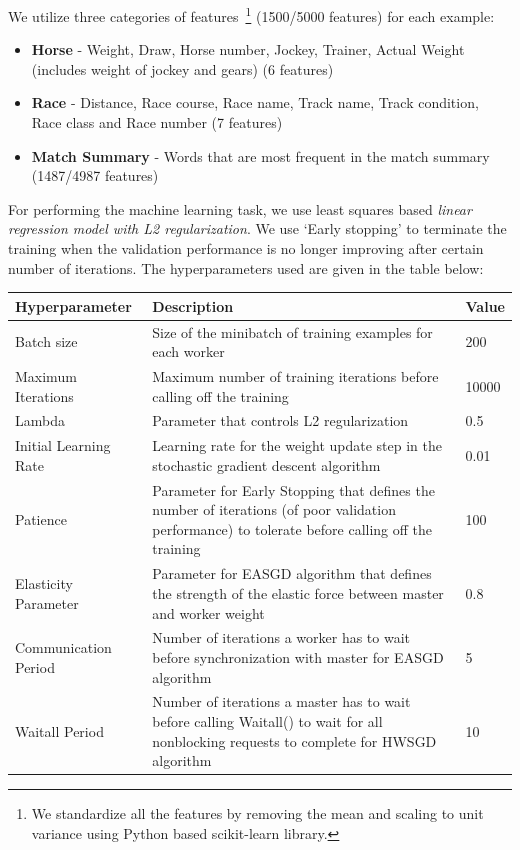\documentclass[12pt]{article}
\begin{document}
We utilize three categories of features~\footnote{We standardize all the features by removing the mean and scaling to unit variance using Python based scikit-learn library.} (1500/5000 features) for each example:
\begin{itemize}
  \item \textbf{Horse} - Weight, Draw, Horse number, Jockey, Trainer, Actual Weight (includes weight of jockey and gears) (6 features)
  \item \textbf{Race} - Distance, Race course, Race name, Track name, Track condition, Race class and Race number (7 features)
  \item \textbf{Match Summary} - Words that are most frequent in the match summary (1487/4987 features)
\end{itemize}

For performing the machine learning task, we use least squares based \textit{linear regression model with L2 regularization}. We use `Early stopping' to terminate the training when the validation performance is no longer improving after certain number of iterations. The hyperparameters used are given in the table below:
\begin{table}[ht]
\centering
 \begin{tabular}{lp{4.5in}l} 
 \toprule
\textbf{Hyperparameter} & \textbf{Description} & \textbf{Value} \\ \midrule
Batch size & Size of the minibatch of training examples for each worker & 200 \\
Maximum Iterations & Maximum number of training iterations before calling off the training & 10000 \\
Lambda & Parameter that controls L2 regularization & 0.5\\
Initial Learning Rate & Learning rate for the weight update step in the stochastic gradient descent algorithm & 0.01 \\
Patience & Parameter for Early Stopping that defines the number of iterations (of poor validation performance) to tolerate before calling off the training & 100 \\
Elasticity Parameter & Parameter for EASGD algorithm that defines the strength of the elastic force between master and worker weight & 0.8 \\
Communication Period & Number of iterations a worker has to wait before synchronization with master for EASGD algorithm & 5 \\
Waitall Period & Number of iterations a master has to wait before calling Waitall() to wait for all nonblocking requests to complete for HWSGD algorithm & 10 \\
\bottomrule
\end{tabular}
\end{table}
\end{document}
